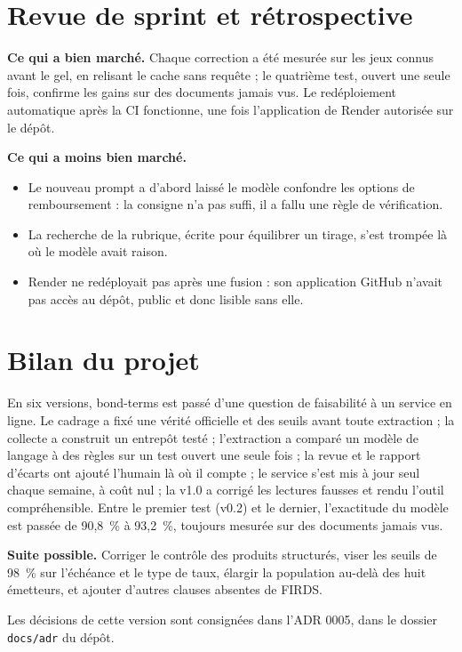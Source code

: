 \documentclass[11pt,a4paper]{article}
\begin{document}

\section{Revue de sprint et rétrospective}

\textbf{Ce qui a bien marché.} Chaque correction a été mesurée sur les jeux connus avant le gel, en relisant le cache sans requête ; le quatrième test, ouvert une seule fois, confirme les gains sur des documents jamais vus. Le redéploiement automatique après la CI fonctionne, une fois l'application de Render autorisée sur le dépôt.

\textbf{Ce qui a moins bien marché.}
\begin{itemize}
  \item Le nouveau prompt a d'abord laissé le modèle confondre les options de remboursement : la consigne n'a pas suffi, il a fallu une règle de vérification.
  \item La recherche de la rubrique, écrite pour équilibrer un tirage, s'est trompée là où le modèle avait raison.
  \item Render ne redéployait pas après une fusion : son application GitHub n'avait pas accès au dépôt, public et donc lisible sans elle.
\end{itemize}

\section{Bilan du projet}

En six versions, bond-terms est passé d'une question de faisabilité à un service en ligne. Le cadrage a fixé une vérité officielle et des seuils avant toute extraction ; la collecte a construit un entrepôt testé ; l'extraction a comparé un modèle de langage à des règles sur un test ouvert une seule fois ; la revue et le rapport d'écarts ont ajouté l'humain là où il compte ; le service s'est mis à jour seul chaque semaine, à coût nul ; la v1.0 a corrigé les lectures fausses et rendu l'outil compréhensible. Entre le premier test (v0.2) et le dernier, l'exactitude du modèle est passée de 90,8~\% à 93,2~\%, toujours mesurée sur des documents jamais vus.

\textbf{Suite possible.} Corriger le contrôle des produits structurés, viser les seuils de 98~\% sur l'échéance et le type de taux, élargir la population au-delà des huit émetteurs, et ajouter d'autres clauses absentes de FIRDS.

Les décisions de cette version sont consignées dans l'ADR 0005, dans le dossier \texttt{docs/adr} du dépôt.
\end{document}
